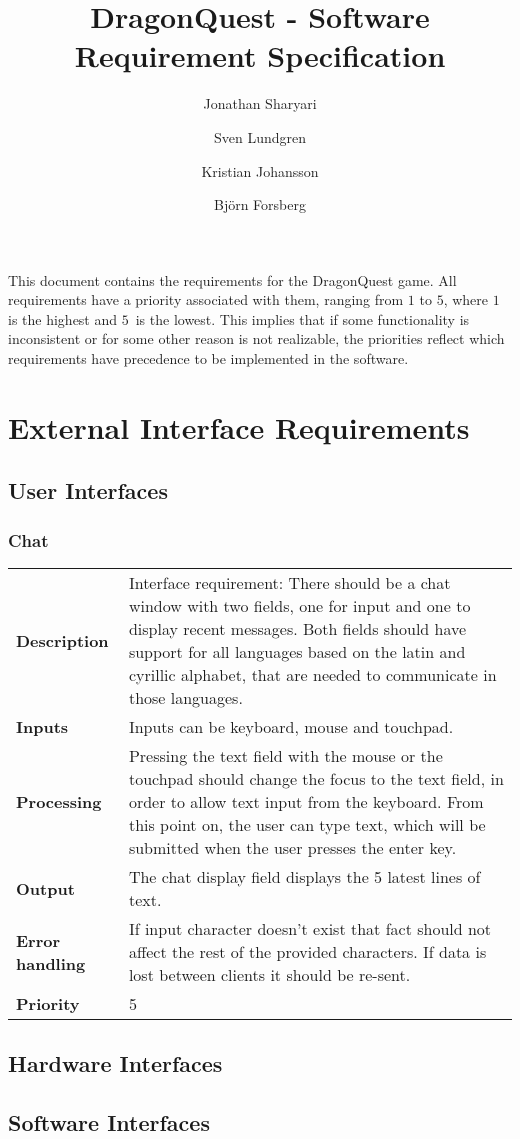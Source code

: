 \documentclass[a4paper,10pt]{article}
\title{\textbf{DragonQuest - Software Requirement Specification}}
\author{Jonathan Sharyari \and Sven Lundgren \and Kristian Johansson \and Bj{\"o}rn Forsberg}
\newcommand{\requirement}[1]{\subsubsection{#1}\begin{tabular}{l p{12.2cm}}}
\newcommand{\reqsection}[1]{\\ \textbf{#1} &}
\newcommand{\stoprequirement}{\end{tabular}}
\begin{document}
\maketitle

This document contains the requirements for the DragonQuest game. All requirements have a priority associated with them, ranging from $1$ to $5$, where $1$ is the highest and $5$ is the lowest. This implies that if some functionality is inconsistent or for some other reason is not realizable, the priorities reflect which requirements have precedence to be implemented in the software.

\section{External Interface Requirements}
\subsection{User Interfaces}

\requirement{Chat}
\reqsection{Description}
Interface requirement: There should be a chat window with two fields, one for input and one to display recent messages. Both fields should have support for all languages based on the latin and cyrillic alphabet, that are needed to communicate in those languages.

\reqsection{Inputs}
Inputs can be keyboard, mouse and touchpad.

\reqsection{Processing}
Pressing the text field with the mouse or the touchpad should change the focus to the text field, in order to allow text input from the keyboard. From this point on, the user can type text, which will be submitted when the user presses the enter key. 

\reqsection{Output}
The chat display field displays the 5 latest lines of text. 

\reqsection{Error handling}
If input character doesn't exist that fact should not affect the rest of the provided characters. If data is lost between clients it should be re-sent.

\reqsection{Priority}
5

\stoprequirement

\subsection{Hardware Interfaces}
\subsection{Software Interfaces}
\end{document}
